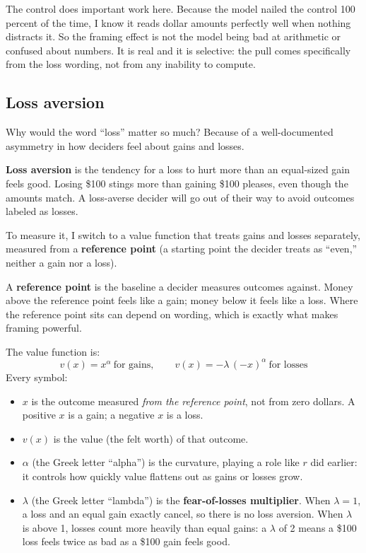\documentclass[11pt]{article}
\newcommand{\term}[1]{\textbf{\color{mossdk}#1}}
\begin{document}
The control does important work here. Because the model nailed the control 100 percent of the time, I
know it reads dollar amounts perfectly well when nothing distracts it. So the framing effect is not the
model being bad at arithmetic or confused about numbers. It is real and it is selective: the pull comes
specifically from the loss wording, not from any inability to compute.

\subsection{Loss aversion}

Why would the word ``loss'' matter so much? Because of a well-documented asymmetry in how deciders feel
about gains and losses.

\begin{defbox}
\term{Loss aversion} is the tendency for a loss to hurt more than an equal-sized gain feels good.
Losing \$100 stings more than gaining \$100 pleases, even though the amounts match. A loss-averse
decider will go out of their way to avoid outcomes labeled as losses.
\end{defbox}

To measure it, I switch to a value function that treats gains and losses separately, measured from a
\term{reference point} (a starting point the decider treats as ``even,'' neither a gain nor a loss).

\begin{defbox}
A \term{reference point} is the baseline a decider measures outcomes against. Money above the reference
point feels like a gain; money below it feels like a loss. Where the reference point sits can depend on
wording, which is exactly what makes framing powerful.
\end{defbox}

The value function is:
\[
v(x) = x^{\alpha} \ \text{for gains}, \qquad v(x) = -\lambda\,(-x)^{\alpha} \ \text{for losses}
\]
Every symbol:
\begin{itemize}
\item $x$ is the outcome measured \emph{from the reference point}, not from zero dollars. A positive
$x$ is a gain; a negative $x$ is a loss.
\item $v(x)$ is the value (the felt worth) of that outcome.
\item $\alpha$ (the Greek letter ``alpha'') is the curvature, playing a role like $r$ did earlier: it
controls how quickly value flattens out as gains or losses grow.
\item $\lambda$ (the Greek letter ``lambda'') is the \term{fear-of-losses multiplier}. When
$\lambda = 1$, a loss and an equal gain exactly cancel, so there is no loss aversion. When $\lambda$ is
above 1, losses count more heavily than equal gains: a $\lambda$ of 2 means a \$100 loss feels twice as
bad as a \$100 gain feels good.
\end{itemize}
\end{document}
